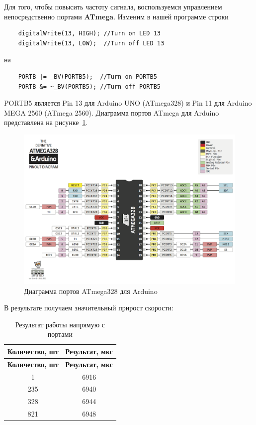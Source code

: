 Для того, чтобы повысить частоту сигнала, воспользуемся управлением непосредственно портами \textbf{ATmega}. Изменим в нашей программе строки

\begin{verbatim}
    digitalWrite(13, HIGH); //Turn on LED 13
    digitalWrite(13, LOW);  //Turn off LED 13
\end{verbatim}

на

\begin{verbatim}
    PORTB |= _BV(PORTB5);  //Turn on PORTB5
    PORTB &= ~_BV(PORTB5); //Turn off PORTB5
\end{verbatim}

PORTB5 является Pin 13 для Arduino UNO (ATmega328) и Pin 11 для Arduino MEGA 2560 (ATmega 2560). Диаграмма портов ATmega для Arduino представлена на рисунке~\ref{fig:a328diagram}.

\begin{figure}[ht]
    \includegraphics[width=1\linewidth]{Figures/a328diagram.png}
    \caption{Диаграмма портов ATmega328 для Arduino}
    \label{fig:a328diagram}
\end{figure}

В результате получаем значительный прирост скорости:

\begin{longtable}[c]{|c|c|}
    \caption{Результат работы напрямую с портами}
    \label{PortsResult}\\
    \hline
    \textbf{Количество, шт} & \textbf{Результат, мкс}\\
    \hline
    \endfirsthead
    \hline
    \textbf{Количество, шт} & \textbf{Результат, мкс}\\
    \hline
    \endhead
        1 & 6916\\
        \hline
        235 & 6940\\
        \hline
        328 & 6944\\
        \hline
        821 & 6948\\
        \hline
\end{longtable}

